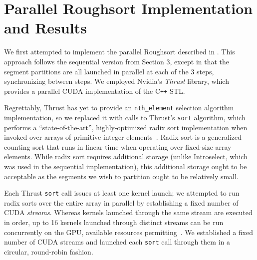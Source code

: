 \documentclass[letterpaper, 12pt]{article}
\let\supercite\cite
\renewcommand{\cite}[1]{\textnormal{~\supercite{#1}}}
\begin{document}
\begin{sidewaysfigure}

\vspace{-4ex}
\caption{\label{fig:seqpar2}{\em
  Radius Determination Runtimes over Arrays of Length $n\cdot 10^6$, $k = 2$
}}
\end{sidewaysfigure}

\begin{sidewaysfigure}

\vspace{-4ex}
\caption{\label{fig:seqpar100}{\em
  Radius Determination Runtimes over Arrays of Length $n\cdot 10^6$, $k = 100$
}}
\end{sidewaysfigure}

\clearpage
\section{Parallel Roughsort Implementation and Results}

We first attempted to implement the parallel Roughsort described in \supercite{altman89}.
This approach follows the sequential version from Section 3, except in that the segment partitions are all launched in parallel
  at each of the 3 steps, synchronizing between steps.
We employed Nvidia's \textit{Thrust} library, which provides a parallel CUDA implementation of the C\texttt{++} STL.

Regrettably, Thrust has yet to provide an \texttt{nth_element} selection algorithm implementation, so we replaced it with calls
  to Thrust's \texttt{sort} algorithm, which performs a ``state-of-the-art'', highly-optimized radix sort
  implementation when invoked over arrays of primitive integer elements\cite{thrustradix, leischner09}.
Radix sort is a generalized counting sort that runs in linear time when operating over fixed-size array elements.
While radix sort requires additional storage (unlike Introselect, which was used in the sequential implementation), this
  additional storage ought to be acceptable as the segments we wish to partition ought to be relatively small.

Each Thrust \texttt{sort} call issues at least one kernel launch; we attempted to run radix sorts over the entire array in
  parallel by establishing a fixed number of CUDA \textit{streams}.
Whereas kernels launched through the same stream are executed in order, up to 16 kernels launched through distinct streams can be
  run concurrently on the GPU, available resources permitting\cite{cuda}.
We established a fixed number of CUDA streams and launched each \texttt{sort} call through them in a circular, round-robin
  fashion.
\end{document}
